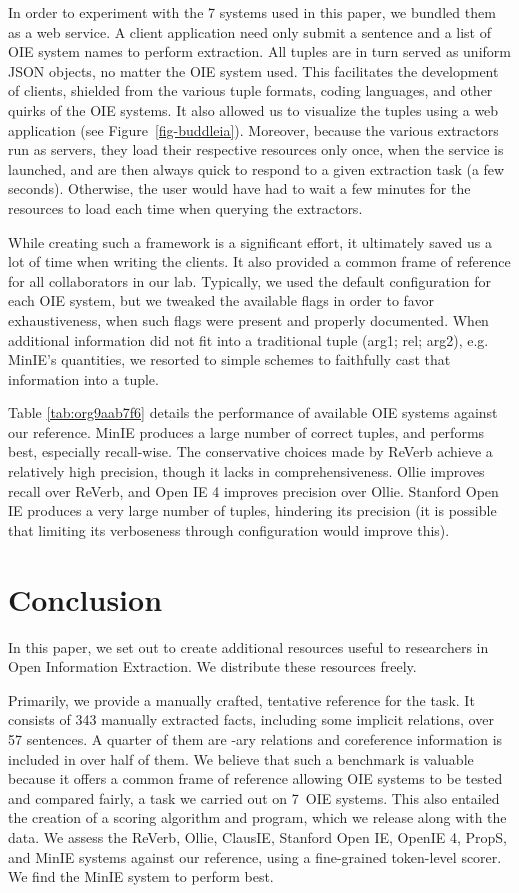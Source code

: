 \pdfoutput=1 \documentclass[11pt, a4paper]{article}
\begin{document}
In order to experiment with the 7 systems used in this paper, we
bundled them as a web service. A client application
need only submit a sentence and a list of OIE system names to perform
extraction. All tuples are in turn served as uniform JSON objects, no matter the OIE system used. This
facilitates the development of clients, shielded from the
various tuple formats, coding languages,
and other quirks of the OIE systems. It also allowed us to
visualize the tuples using a web application (see
Figure~\ref{fig-buddleia}). Moreover, because the various extractors run as servers,
they load their respective resources only once, when the service is launched, 
and are then always quick to respond to a given extraction task (a few seconds). Otherwise, 
the user would have had to wait a few minutes for the resources to load each time when querying the extractors.

While creating such a framework is a significant
effort, it ultimately saved us a lot of time when writing the clients. It
also provided a common frame of reference for all collaborators in our
lab. Typically, we used the default configuration for each OIE system, but
we tweaked the available flags in order to favor exhaustiveness, when such
flags were present and properly documented. When additional information did
not fit into a traditional tuple (arg1; rel; arg2), e.g. MinIE's
quantities, we resorted to simple schemes to faithfully cast that
information into a tuple.

Table \ref{tab:org9aab7f6} details the performance of available OIE systems against our
reference. MinIE produces a large number of correct tuples, and performs best, especially recall-wise. The conservative
choices made by ReVerb achieve a relatively high precision, though it lacks
in comprehensiveness. Ollie improves recall over ReVerb, and Open IE 4 improves precision over Ollie. Stanford Open IE produces a very large number of tuples, hindering its precision (it is possible that limiting its verboseness through configuration would improve this). 
\section{Conclusion}
\label{sec:orgad750a7}

In this paper, we set out to create additional resources useful to researchers in Open Information Extraction. We distribute these resources freely.

Primarily, we provide a manually crafted, tentative reference for the task. It consists of 343 manually extracted facts, including some implicit relations, over 57 sentences. A quarter of them are -ary relations and coreference information is included in over half of them. We believe that such a benchmark is valuable because it offers a common frame of reference allowing OIE systems to be tested and compared fairly, a task we carried out on 7~OIE systems. This also entailed the creation of a scoring algorithm and program, which we release along with the data. We assess the ReVerb, Ollie, ClausIE, Stanford Open IE, OpenIE 4, PropS, and MinIE
systems against our reference, using a fine-grained token-level scorer. We find the MinIE system to perform best.
\end{document}
